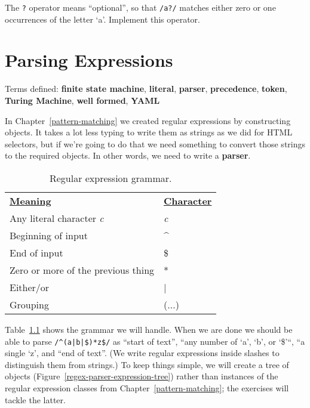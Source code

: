 \documentclass[krantzl]{krantz}
\newcommand{\chapref}[1]{Chapter~\ref{#1}}
\newcommand{\figref}[1]{Figure~\ref{#1}}
\newcommand{\tblref}[1]{Table~\ref{#1}}
\newcommand{\glossref}[1]{\textbf{#1}}
\begin{document}
The \texttt{?} operator means “optional”,
so that \texttt{/a?/} matches either zero or one occurrences of the letter ‘a’.
Implement this operator.

\chapter{Parsing Expressions}\label{regex-parser}


\noindent 
  Terms defined: \glossref{finite state machine}, \glossref{literal}, \glossref{parser}, \glossref{precedence}, \glossref{token}, \glossref{Turing Machine}, \glossref{well formed}, \glossref{YAML}



In \chapref{pattern-matching} we created regular expressions by constructing objects.
It takes a lot less typing to write them as strings as we did for HTML selectors,
but if we’re going to do that we need something to convert those strings to the required objects.
In other words, we need to write a \glossref{parser}.

\begin{table}[h]
\begin{tabular}{ll}
\textbf{\underline{Meaning}} & \textbf{\underline{Character}} \\
Any literal character \emph{c} & \emph{c} \\
Beginning of input & {\textasciicircum} \\
End of input & \$ \\
Zero or more of the previous thing & * \\
Either/or & | \\
Grouping & (...) \\
\end{tabular}
\caption{Regular expression grammar.}
\label{regex-parser-grammar-codes}
\end{table}



\tblref{regex-parser-grammar-codes} shows the grammar we will handle.
When we are done
we should be able to parse \texttt{/{\textasciicircum}(a|b|\$)*z\$/} as
“start of text”,
“any number of ‘a’, ‘b’, or ‘\$’“,
“a single ‘z’,
and “end of text”.
(We write regular expressions inside slashes to distinguish them from strings.)
To keep things simple,
we will create a tree of objects (\figref{regex-parser-expression-tree})
rather than instances of the regular expression classes from \chapref{pattern-matching};
the exercises will tackle the latter.
\end{document}
